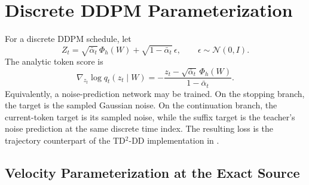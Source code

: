 \documentclass[11pt]{article}
\theoremstyle{definition}
\theoremstyle{remark}
\newcommand{\Normal}{\mathcal N}
\begin{document}
\section{Discrete DDPM Parameterization}
\label{app:ddpm}

For a discrete DDPM schedule, let
\begin{equation}
Z_t
=
\sqrt{\bar\alpha_t}\,\Phi_h(W)
+
\sqrt{1-\bar\alpha_t}\,\epsilon,
\qquad
\epsilon\sim\Normal(0,I).
\end{equation}
The analytic token score is
\begin{equation}
\nabla_{z_t}
\log q_t(z_t\mid W)
=
-
\frac{
 z_t-\sqrt{\bar\alpha_t}\,\Phi_h(W)
}{1-\bar\alpha_t}.
\end{equation}
Equivalently, a noise-prediction network may be trained. On the stopping branch,
the target is the sampled Gaussian noise. On the continuation branch, the
current-token target is its sampled noise, while the suffix target is the
teacher's noise prediction at the same discrete time index. The resulting loss
is the trajectory counterpart of the TD$^2$-DD implementation in
\citet{farebrother2025tdflow}.

\subsection{Velocity Parameterization at the Exact Source}
\label{app:vpred}
\end{document}
